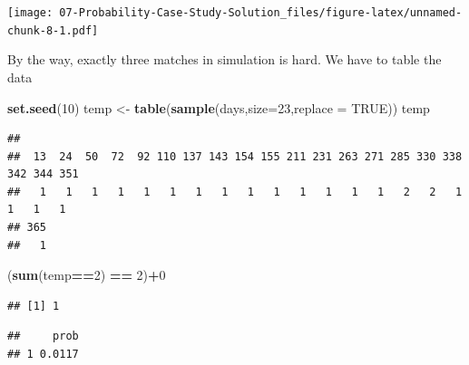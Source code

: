 \documentclass[
]{book}
\newenvironment{Shaded}{\begin{snugshade}}{\end{snugshade}}
\newcommand{\DataTypeTok}[1]{\textcolor[rgb]{0.13,0.29,0.53}{#1}}
\newcommand{\DecValTok}[1]{\textcolor[rgb]{0.00,0.00,0.81}{#1}}
\newcommand{\KeywordTok}[1]{\textcolor[rgb]{0.13,0.29,0.53}{\textbf{#1}}}
\newcommand{\NormalTok}[1]{#1}
\newcommand{\OperatorTok}[1]{\textcolor[rgb]{0.81,0.36,0.00}{\textbf{#1}}}
\newcommand{\OtherTok}[1]{\textcolor[rgb]{0.56,0.35,0.01}{#1}}
\newcommand{\StringTok}[1]{\textcolor[rgb]{0.31,0.60,0.02}{#1}}
\begin{document}
\texttt{[image: 07-Probability-Case-Study-Solution\_files/figure-latex/unnamed-chunk-8-1.pdf]}

By the way, exactly three matches in simulation is hard. We have to table the data

\begin{Shaded}
\begin{Highlighting}[]
\KeywordTok{set.seed}\NormalTok{(}\DecValTok{10}\NormalTok{)}
\NormalTok{temp <-}\StringTok{ }\KeywordTok{table}\NormalTok{(}\KeywordTok{sample}\NormalTok{(days,}\DataTypeTok{size=}\DecValTok{23}\NormalTok{,}\DataTypeTok{replace =} \OtherTok{TRUE}\NormalTok{))}
\NormalTok{temp}
\end{Highlighting}
\end{Shaded}

\begin{verbatim}
## 
##  13  24  50  72  92 110 137 143 154 155 211 231 263 271 285 330 338 342 344 351 
##   1   1   1   1   1   1   1   1   1   1   1   1   1   1   2   2   1   1   1   1 
## 365 
##   1
\end{verbatim}

\begin{Shaded}
\begin{Highlighting}[]
\NormalTok{(}\KeywordTok{sum}\NormalTok{(temp}\OperatorTok{==}\DecValTok{2}\NormalTok{) }\OperatorTok{==}\StringTok{ }\DecValTok{2}\NormalTok{)}\OperatorTok{+}\DecValTok{0}
\end{Highlighting}
\end{Shaded}

\begin{verbatim}
## [1] 1
\end{verbatim}

\begin{Shaded}
\end{Shaded}

\begin{verbatim}
##     prob
## 1 0.0117
\end{verbatim}
\end{document}
